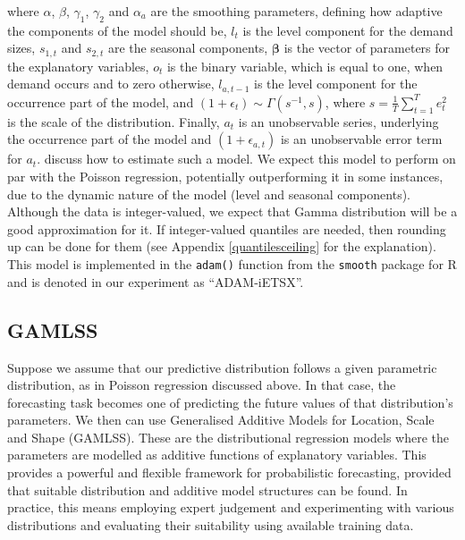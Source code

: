 \documentclass[]{elsarticle} %
\begin{document}
where \(\alpha\), \(\beta\), \(\gamma_1\), \(\gamma_2\) and \(\alpha_a\) are the smoothing parameters, defining how adaptive the components of the model should be, \(l_t\) is the level component for the demand sizes, \(s_{1,t}\) and \(s_{2,t}\) are the seasonal components, \(\boldsymbol{\beta}\) is the vector of parameters for the explanatory variables, \(o_t\) is the binary variable, which is equal to one, when demand occurs and to zero otherwise, \(l_{a,t-1}\) is the level component for the occurrence part of the model, and \(\left(1+\epsilon_t \right) \sim \Gamma(s^{-1}, s)\), where \(s=\frac{1}{T} \sum_{t=1}^{T} e_{t}^2\) is the scale of the distribution. Finally, \(a_t\) is an unobservable series, underlying the occurrence part of the model and \((1 + \epsilon_{a,t})\) is an unobservable error term for \(a_t\). \citet{Svetunkov2019a} discuss how to estimate such a model. We expect this model to perform on par with the Poisson regression, potentially outperforming it in some instances, due to the dynamic nature of the model (level and seasonal components). Although the data is integer-valued, we expect that Gamma distribution will be a good approximation for it. If integer-valued quantiles are needed, then rounding up can be done for them (see Appendix \ref{quantilesceiling} for the explanation). This model is implemented in the \texttt{adam()} function from the \texttt{smooth} package \citep{Svetunkov2021Smooth} for R and is denoted in our experiment as ``ADAM-iETSX''.

\hypertarget{gamlss}{%
\subsection{GAMLSS}\label{gamlss}}

Suppose we assume that our predictive distribution follows a given parametric distribution, as in Poisson regression discussed above. In that case, the forecasting task becomes one of predicting the future values of that distribution's parameters. We then can use Generalised Additive Models for Location, Scale and Shape (GAMLSS). These are the distributional regression models where the parameters are modelled as additive functions of explanatory variables. This provides a powerful and flexible framework for probabilistic forecasting, provided that suitable distribution and additive model structures can be found. In practice, this means employing expert judgement and experimenting with various distributions and evaluating their suitability using available training data.
\end{document}
